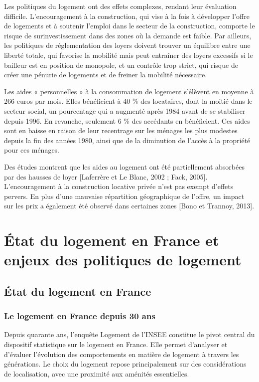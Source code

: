 \documentclass[a4paper, 12pt]{report}
\begin{document}
Les politiques du logement ont des effets complexes, rendant leur évaluation difficile. L’encouragement à la construction, qui vise à la fois à développer l’offre de logements et à soutenir l’emploi dans le secteur de la construction, comporte le risque de surinvestissement dans des zones où la demande est faible. Par ailleurs, les politiques de réglementation des loyers doivent trouver un équilibre entre une liberté totale, qui favorise la mobilité mais peut entraîner des loyers excessifs si le bailleur est en position de monopole, et un contrôle trop strict, qui risque de créer une pénurie de logements et de freiner la mobilité nécessaire.

Les aides « personnelles » à la consommation de logement s'élèvent en moyenne à 266 euros par mois. Elles bénéficient à 40 \% des locataires, dont la moitié dans le secteur social, un pourcentage qui a augmenté après 1984 avant de se stabiliser depuis 1996. En revanche, seulement 6 \% des accédants en bénéficient. Ces aides sont en baisse en raison de leur recentrage sur les ménages les plus modestes depuis la fin des années 1980, ainsi que de la diminution de l'accès à la propriété pour ces ménages.

Des études montrent que les aides au logement ont été partiellement absorbées par des hausses de loyer [Laferrère et Le Blanc, 2002 ; Fack, 2005]. L’encouragement à la construction locative privée n’est pas exempt d’effets pervers. En plus d'une mauvaise répartition géographique de l'offre, un impact sur les prix a également été observé dans certaines zones [Bono et Trannoy, 2013].

\chapter{État du logement en France et enjeux des politiques de logement}

\section{État du logement en France}

\subsection{Le logement en France depuis 30 ans}

Depuis quarante ans, l’enquête Logement de l’INSEE constitue le pivot central du dispositif statistique sur le logement en France. Elle permet d'analyser et d'évaluer l'évolution des comportements en matière de logement à travers les générations. Le choix du logement repose principalement sur des considérations de localisation, avec une proximité aux aménités essentielles. 
\end{document}
